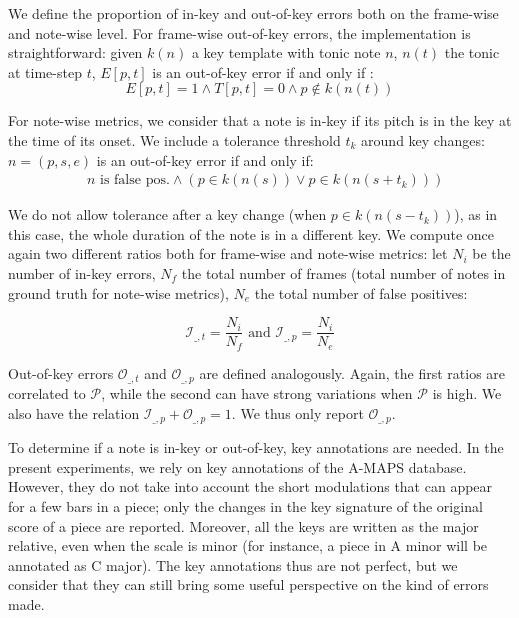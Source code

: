 \documentclass{article}
\begin{document}
We define the proportion of in-key and out-of-key errors both on the frame-wise and note-wise level.
For frame-wise out-of-key errors, the implementation is straightforward: given $k(n)$ a key template with tonic note $n$, $n(t)$ the tonic at time-step $t$,
$E[p,t]$ is an out-of-key error if and only if :
\vspace{-0.2cm}
\[
E[p,t] = 1 \wedge T[p,t] = 0 \wedge p \notin k(n(t))
\]

\vspace{-0.2cm}
For note-wise metrics, we consider that a note is in-key if its pitch is in the key at the time of its onset. We include a tolerance threshold $t_k$ around key changes: $n=(p,s,e)$ is an out-of-key error
if and only if: 
\vspace{-0.2cm}
\setlength{\jot}{0pt}
\begin{align*}
& n \text{ is false pos.} \wedge (p \in k(n(s)) \vee p \in k(n(s + t_k)))
\end{align*}

\vspace{-0.2cm}
We do not allow tolerance after a key change (when $p \in k(n(s - t_k))$), as in this case, the whole duration of the note is in a different key. We compute once again two different ratios both for frame-wise and note-wise metrics:  
let $N_i$  be the number of in-key errors, $N_f$ the total number of frames (total number of notes in ground truth for note-wise metrics), $N_e$ the total number of false positives:

\vspace{-0.35cm}
\[
\mathcal{I}_{\_,t} = \frac{N_i}{N_f} \textrm{ and } 
\mathcal{I}_{\_,p} = \frac{N_i}{N_e}
\]

\vspace{-0.10cm}
Out-of-key errors $\mathcal{O}_{\_,t}$ and $\mathcal{O}_{\_,p}$ are defined analogously.
Again, the first ratios are correlated to $\mathcal{P}$, while the second can have strong variations when $\mathcal{P}$ is high. 
We also have the relation $\mathcal{I}_{\_,p} + \mathcal{O}_{\_,p} = 1$. We thus only report $\mathcal{O}_{\_,p}$.

To determine if a note is in-key or out-of-key, key annotations are needed.
In the present experiments, we rely on key annotations of the A-MAPS database. 
However, they do not take into account the short modulations that can appear for a few bars in a piece; only the changes in the key signature of the original score of a piece are reported.
Moreover, all the keys are written as the major relative, even when the scale is minor (for instance, a piece in A minor will be annotated as C major).
The key annotations thus are not perfect, but we consider that they can still bring some useful perspective on the kind of errors made.
\end{document}
